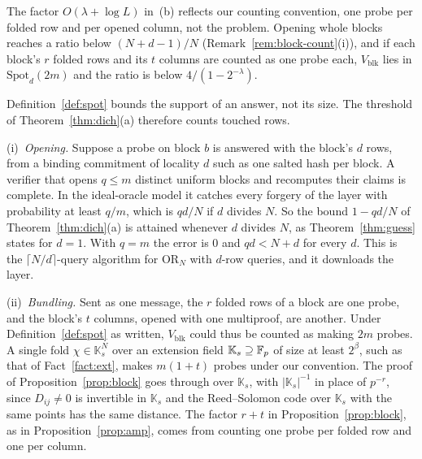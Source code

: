 \noindent The factor $O(\lambda+\log L)$ in~(b) reflects our counting convention, one probe per folded
row and per opened column, not the problem. Opening whole blocks reaches a ratio below $(N+d-1)/N$
(Remark~\ref{rem:block-count}(i)), and if each block's $r$ folded rows and its $t$ columns are counted
as one probe each, $V_{\mathrm{blk}}$ lies in $\mathrm{Spot}_d(2m)$ and the ratio is below
$4/(1-2^{-\lambda})$.

\begin{remark}
\label{rem:block-count}
Definition~\ref{def:spot} bounds the support of an answer, not its size. The threshold of
Theorem~\ref{thm:dich}(a) therefore counts touched rows.

(i)~\emph{Opening.} Suppose a probe on block $b$ is answered with the block's $d$ rows, from a binding
commitment of locality $d$ such as one salted hash per block. A verifier that opens $q\le m$ distinct
uniform blocks and recomputes their claims is complete. In the ideal-oracle model it catches every
forgery of the layer with probability at least $q/m$, which is $qd/N$ if $d$ divides $N$. So the bound
$1-qd/N$ of Theorem~\ref{thm:dich}(a) is attained whenever $d$ divides $N$, as Theorem~\ref{thm:guess}
states for $d=1$. With $q=m$ the error is $0$ and $qd<N+d$ for every $d$. This is the
$\lceil N/d\rceil$-query algorithm for $\mathrm{OR}_N$ with $d$-row queries, and it downloads the
layer.

(ii)~\emph{Bundling.} Sent as one message, the $r$ folded rows of a block are one probe, and the
block's $t$ columns, opened with one multiproof, are another. Under Definition~\ref{def:spot} as
written, $V_{\mathrm{blk}}$ could thus be counted as making $2m$ probes. A single fold
$\chi\in\mathbb K_s^N$ over an extension field $\mathbb K_s\supseteq\mathbb{F}_p$ of size at least $2^\beta$,
such as that of Fact~\ref{fact:ext}, makes $m(1+t)$ probes under our convention. The proof of
Proposition~\ref{prop:block} goes through over $\mathbb K_s$, with $|\mathbb K_s|^{-1}$ in place of
$p^{-r}$, since $D_{ij}\neq0$ is invertible in $\mathbb K_s$ and the Reed--Solomon code over
$\mathbb K_s$ with the same points has the same distance. The factor $r+t$ in
Proposition~\ref{prop:block}, as in Proposition~\ref{prop:amp}, comes from counting one probe per
folded row and one per column.


\end{remark}
